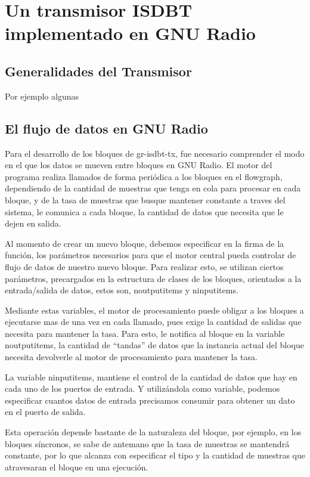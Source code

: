 \chapter{Un transmisor ISDBT implementado en GNU Radio}

\section{Generalidades del Transmisor}
Por ejemplo algunas
\section{El flujo de datos en GNU Radio}

Para el desarrollo de los bloques de gr-isdbt-tx, fue necesario comprender el modo en el que los datos se mueven entre bloques en GNU Radio. El motor del programa realiza llamados de forma periódica a los bloques en el flowgraph, dependiendo de la cantidad de muestras que tenga en cola para procesar en cada bloque, y de la tasa de muestras que busque mantener constante a traves del sistema, le comunica a cada bloque, la cantidad de datos que necesita que le dejen en salida.  

Al momento de crear un nuevo bloque, debemos especificar en la firma de la función, los parámetros necesarios para que el motor central pueda controlar de flujo de datos de nuestro nuevo bloque. Para realizar esto, se utilizan ciertos parámetros, precargados en la estructura de clases de los bloques, orientados a la entrada/salida de datos, estos son,  noutputitems y ninputitems. 

Mediante estas variables, el motor de procesamiento puede obligar a los bloques a ejecutarse mas de una vez en cada llamado, pues exige la cantidad de salidas que necesita para mantener la tasa. Para esto, le notifica al bloque en la variable noutputitems, la cantidad de “tandas” de datos que la instancia actual del bloque necesita devolverle al motor de procesamiento para mantener la tasa. 

La variable ninputitems, mantiene el control de la cantidad de datos que hay en cada uno de los puertos de entrada. Y utilizándola como variable, podemos especificar cuantos datos de entrada precisamos consumir para obtener un dato en el puerto de salida.

Esta operación depende bastante de la naturaleza del bloque, por ejemplo, en los bloques síncronos, se sabe de antemano que la tasa de muestras se mantendrá constante, por lo que alcanza con especificar el tipo y la cantidad de muestras que atravesaran el bloque en una ejecución. 

